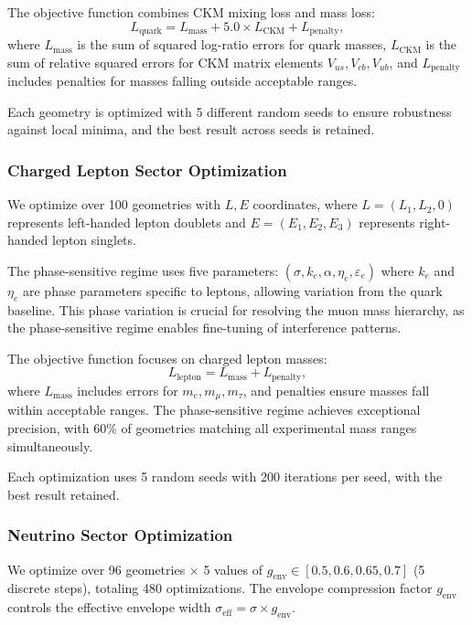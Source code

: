 \documentclass[12pt,a4paper]{article}
\begin{document}
The objective function combines CKM mixing loss and mass loss:
\begin{equation}
L_{\text{quark}} = L_{\text{mass}} + 5.0 \times L_{\text{CKM}} + L_{\text{penalty}},
\end{equation}
where $L_{\text{mass}}$ is the sum of squared log-ratio errors for quark masses, $L_{\text{CKM}}$ is the sum of relative squared errors for CKM matrix elements $V_{us}, V_{cb}, V_{ub}$, and $L_{\text{penalty}}$ includes penalties for masses falling outside acceptable ranges.

Each geometry is optimized with 5 different random seeds to ensure robustness against local minima, and the best result across seeds is retained.

\subsubsection{Charged Lepton Sector Optimization}

We optimize over 100 geometries with $L, E$ coordinates, where $L = (L_1, L_2, 0)$ represents left-handed lepton doublets and $E = (E_1, E_2, E_3)$ represents right-handed lepton singlets.

The phase-sensitive regime uses five parameters: $(\sigma, k_e, \alpha, \eta_e, \varepsilon_e)$ where $k_e$ and $\eta_e$ are phase parameters specific to leptons, allowing variation from the quark baseline. This phase variation is crucial for resolving the muon mass hierarchy, as the phase-sensitive regime enables fine-tuning of interference patterns.

The objective function focuses on charged lepton masses:
\begin{equation}
L_{\text{lepton}} = L_{\text{mass}} + L_{\text{penalty}},
\end{equation}
where $L_{\text{mass}}$ includes errors for $m_e, m_\mu, m_\tau$, and penalties ensure masses fall within acceptable ranges. The phase-sensitive regime achieves exceptional precision, with 60\% of geometries matching all experimental mass ranges simultaneously.

Each optimization uses 5 random seeds with 200 iterations per seed, with the best result retained.

\subsubsection{Neutrino Sector Optimization}

We optimize over 96 geometries $\times$ 5 values of $g_{\text{env}} \in [0.5, 0.6, 0.65, 0.7]$ (5 discrete steps), totaling 480 optimizations. The envelope compression factor $g_{\text{env}}$ controls the effective envelope width $\sigma_{\text{eff}} = \sigma \times g_{\text{env}}$.
\end{document}
